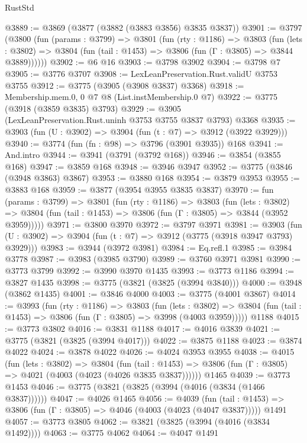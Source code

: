 \begin{lexlean}{RustStd}
\begin{coremodule}
{\begin{coremodule}
{{{{{{{{{{{{{{{{{{{{{{{{{{{{{{{@3889 := @3869 (@3877 (@3882 (@3883 @3856) @3835 @3837))
@3901 := @3797
    (@3800
      (fun (params : @3799) =>
      @3801
        (fun (rty : @1186) =>
        @3803
          (fun (lets : @3802) =>
          @3804 (fun (tail : @1453) => @3806 (fun (Γ : @3805) => @3844 @3889))))))
@3902 := @6 @16
@3903 := @3798 @3902
@3904 := @3798 @7
@3905 := @3776 @3707
@3908 := LexLeanPreservation.Rust.validU @3753 @3755
@3912 := @3775 (@3905 (@3908 @3837) @3368)
@3918 := Membership.mem.{0, 0} @7 @8 (List.instMembership.{0} @7)
@3922 := @3775 (@3918 (@3859 @3835) @3793)
@3929 := @3905 (LexLeanPreservation.Rust.uninh @3753 @3755 @3837 @3793) @3368
@3935 := @3903 (fun (U : @3902) => @3904 (fun (t : @7) => @3912 (@3922 @3929)))
@3940 := @3774 (fun (fn : @98) => @3796 (@3901 @3935)) @168
@3941 := And.intro
@3944 := @3941 (@3791 (@3792 @168))
@3946 := @3854 (@3855 @168)
@3947 := @3859 @168
@3948 := @3946 @3947
@3952 := @3775 (@3846 (@3948 @3863) @3867)
@3953 := @3880 @168
@3954 := @3879 @3953
@3955 := @3883 @168
@3959 := @3877 (@3954 @3955 @3835 @3837)
@3970 := fun (params : @3799) =>
  @3801
    (fun (rty : @1186) =>
    @3803
      (fun (lets : @3802) =>
      @3804 (fun (tail : @1453) => @3806 (fun (Γ : @3805) => @3844 (@3952 @3959)))))
@3971 := @3800 @3970
@3972 := @3797 @3971
@3981 := @3903 (fun (U : @3902) => @3904 (fun (t : @7) => @3912 (@3775 (@3918 @3947 @3793) @3929)))
@3983 := @3944 (@3972 @3981)
@3984 := Eq.refl.{1}
@3985 := @3984 @3778
@3987 := @3983 (@3985 @3790)
@3989 := @3760 @3971 @3981
@3990 := @3773 @3799
@3992 := @3990 @3970 @1435
@3993 := @3773 @1186
@3994 := @3827 @1435
@3998 := @3775 (@3821 (@3825 (@3994 @3840)))
@4000 := @3948 (@3862 @1435)
@4001 := @3846 @4000
@4003 := @3775 (@4001 @3867)
@4014 := @3993
    (fun (rty : @1186) =>
    @3803
      (fun (lets : @3802) =>
      @3804 (fun (tail : @1453) => @3806 (fun (Γ : @3805) => @3998 (@4003 @3959)))))
    @1188
@4015 := @3773 @3802
@4016 := @3831 @1188
@4017 := @4016 @3839
@4021 := @3775 (@3821 (@3825 (@3994 @4017)))
@4022 := @3875 @1188
@4023 := @3874 @4022
@4024 := @3878 @4022
@4026 := @4024 @3953 @3955
@4038 := @4015
    (fun (lets : @3802) =>
    @3804
      (fun (tail : @1453) => @3806 (fun (Γ : @3805) => @4021 (@4003 (@4023 (@4026 @3835 @3837))))))
    @1465
@4039 := @3773 @1453
@4046 := @3775 (@3821 (@3825 (@3994 (@4016 (@3834 (@1466 @3837))))))
@4047 := @4026 @1465
@4056 := @4039
    (fun (tail : @1453) => @3806 (fun (Γ : @3805) => @4046 (@4003 (@4023 (@4047 @3837)))))
    @1491
@4057 := @3773 @3805
@4062 := @3821 (@3825 (@3994 (@4016 (@3834 @1492))))
@4063 := @3775 @4062
@4064 := @4047 @1491
}}}}}}}}}}}}}}}}}}}}}}}}}}}}}}}
\end{coremodule}}
\end{coremodule}
\end{lexlean}

